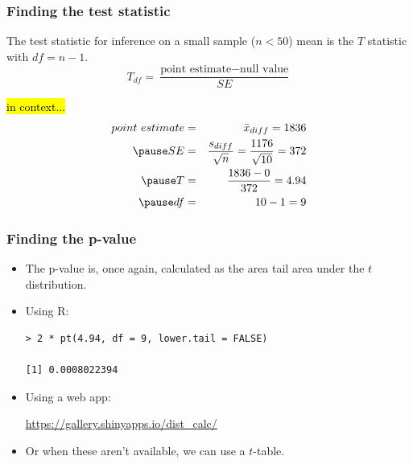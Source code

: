 \documentclass[notes,11pt, aspectratio=169]{beamer}
\begin{document}
\begin{frame}
\frametitle{Finding the test statistic}

{The test statistic for inference on a small sample ($n < 50$) mean is the $T$ statistic with $df = n - 1$.
\[ T_{df} = \frac{\text{point estimate} - \text{null value}}{SE} \]}

\pause

\vspace{-0.5cm}

\hl{in context...}
\begin{eqnarray*}
point~estimate &=& \bar{x}_{diff} = 1836 \\
\pause
SE &=& \frac{s_{diff}}{\sqrt{n}} = \frac{1176}{\sqrt{10}} = 372 \\
\pause
T &=& \frac{1836 - 0}{372} = 4.94 \\
\pause
df &=& 10 - 1 = 9
\end{eqnarray*}

\vspace{-0.25cm}


\end{frame}


\begin{frame}[fragile]
\frametitle{Finding the p-value}

\begin{itemize}

\item The p-value is, once again, calculated as the area tail area under the $t$ distribution.

\pause

\item Using R:
\begin{verbatim}
> 2 * pt(4.94, df = 9, lower.tail = FALSE)

[1] 0.0008022394
\end{verbatim}

\pause

\item Using a web app:

\href{https://gallery.shinyapps.io/dist_calc/}{\textcolor{oiB}{https://gallery.shinyapps.io/dist\_calc/}}

\pause

\item Or when these aren't available, we can use a $t$-table.

\end{itemize}

\end{frame}
\end{document}
